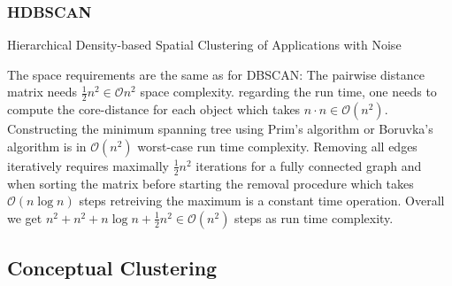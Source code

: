 \subsubsection{HDBSCAN}
\begin{algorithm}[htp]
    \hrulealg
\caption{Hierarchical Density-based Spatial Clustering of Applications with Noise}\label{hdbscan}
\end{algorithm}
The space requirements are the same as for DBSCAN: The pairwise distance matrix needs $\frac{1}{2}n^2 \in \mathcal{O}n^2$ space complexity. regarding the run time, one needs to compute the core-distance for each object which takes $n \cdot n \in \mathcal{O}(n^2)$. Constructing the minimum spanning tree using Prim's algorithm or Boruvka's algorithm is in $\mathcal{O}(n^2)$ worst-case run time complexity. Removing all edges iteratively requires maximally $\frac{1}{2}n^2$ iterations for a fully connected graph and when sorting the matrix before starting the removal procedure which takes $\mathcal{O}(n \log n)$ steps retreiving the maximum is a constant time operation. Overall we get $n^2 + n^2 + n \log n +\frac{1}{2}n^2 \in \mathcal{O}(n^2)$ steps as run time complexity.

\subsection{Conceptual Clustering}
